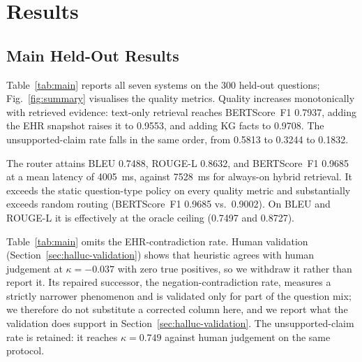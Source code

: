 \documentclass[preprint,12pt]{elsarticle}
\begin{document}
\section{Results}
\label{sec:results}

\subsection{Main Held-Out Results}

Table~\ref{tab:main} reports all seven systems on the 300 held-out
questions; Fig.~\ref{fig:summary} visualises the quality metrics.
Quality increases monotonically with retrieved evidence: text-only
retrieval reaches BERTScore~F1 0.7937, adding the EHR snapshot raises
it to 0.9553, and adding KG facts to 0.9708. The unsupported-claim
rate falls in the same order, from 0.5813 to 0.3244 to 0.1832.

The router attains BLEU 0.7488, ROUGE-L 0.8632, and BERTScore~F1
0.9685 at a mean latency of 4005~ms, against 7528~ms for always-on
hybrid retrieval. It exceeds the static question-type policy on every
quality metric and substantially exceeds random routing
(BERTScore~F1 0.9685 vs.\ 0.9002). On BLEU and ROUGE-L it is
effectively at the oracle ceiling (0.7497 and 0.8727).

Table~\ref{tab:main} omits the EHR-contradiction rate. Human validation
(Section~\ref{sec:halluc-validation}) shows that heuristic agrees with
human judgement at $\kappa = -0.037$ with zero true positives, so we
withdraw it rather than report it. Its repaired successor, the
negation-contradiction rate, measures a strictly narrower phenomenon
and is validated only for part of the question mix; we therefore do not
substitute a corrected column here, and we report what the validation
does support in Section~\ref{sec:halluc-validation}. The
unsupported-claim rate is retained: it reaches $\kappa = 0.749$ against
human judgement on the same protocol.
\end{document}

